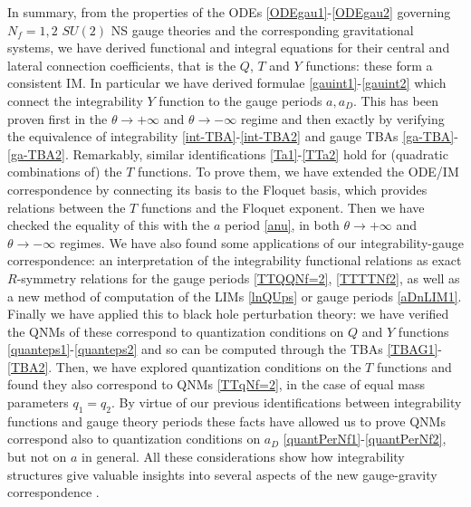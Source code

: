 \documentclass[11pt,a4paper]{elsarticle}
\numberwithin{figure}{section}
\numberwithin{table}{section}
\begin{document}
In summary, from the properties of the ODEs \eqref{ODEgau1}-\eqref{ODEgau2} governing $N_f=1,2$ $SU(2)$ NS gauge theories and the corresponding gravitational systems, %
we have derived functional and integral equations for their central and lateral connection coefficients, that is the $Q$, $T$ and $Y$ functions: these form a consistent IM. In particular we have derived formulae \eqref{gauint1}-\eqref{gauint2} which connect the integrability $Y$ function to the gauge periods $a,a_D$. This has been proven first in the $\theta \to + \infty$ and $\theta \to - \infty$ regime and then exactly by verifying the equivalence of integrability \eqref{int-TBA}-\eqref{int-TBA2} and gauge TBAs \eqref{ga-TBA}-\eqref{ga-TBA2}. Remarkably, similar identifications \eqref{Ta1}-\eqref{TTa2} hold for (quadratic combinations of) the $T$ functions. To prove them, we have extended the ODE/IM correspondence by connecting its basis to the Floquet basis, which provides relations between the $T$ functions and the Floquet exponent. Then we have checked the equality of this with the $a$ period \eqref{anu}, in both $\theta \to + \infty$ and $\theta \to - \infty$ regimes. We have also found some applications of our integrability-gauge correspondence: an interpretation of the integrability functional relations as exact $R$-symmetry relations for the gauge periods \eqref{TTQQNf=2}, \eqref{TTTTNf2}, as well as a new method of computation of the LIMs \eqref{lnQUps} or gauge periods \eqref{aDnLIM1}. Finally we have applied this to black hole perturbation theory: we have verified the QNMs of these correspond to quantization conditions on $Q$ and $Y$ functions \eqref{quanteps1}-\eqref{quanteps2} and so can be computed through the TBAs \eqref{TBAG1}-\eqref{TBA2}. Then, we have explored quantization conditions on the $T$ functions and found they also correspond to QNMs \eqref{TTqNf=2}, in the case of equal mass parameters $q_1=q_2$. By virtue of our previous identifications between integrability functions and gauge theory periods these facts have allowed us to prove QNMs correspond also to quantization conditions on $a_D$ \eqref{quantPerNf1}-\eqref{quantPerNf2}, but not on $a$ in general. All these considerations  show how integrability structures give valuable insights into several aspects of the new gauge-gravity correspondence \cite{AminovGrassiHatsuda:2020,BianchiConsoliGrilloMorales:2021,BianchiConsoliGrilloMorales:2021b,BonelliIossaLichtigTanzini:2021}.
\end{document}
